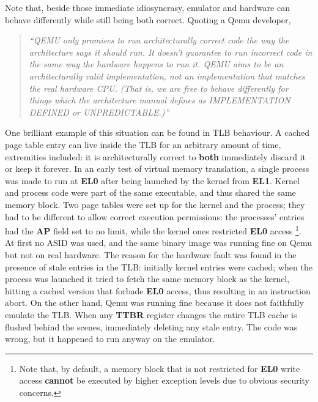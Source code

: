 \documentclass[12pt,a4paper,openright,twoside]{report}
\begin{document}
Note that, beside those immediate idiosyncrasy, emulator and hardware can behave
differently while still being both correct. Quoting a Qemu developer,

\begin{quote}
\textit{``QEMU only promises to run architecturally correct code the
way the architecture says it should run. It doesn't guarantee to
run incorrect code in the same way the hardware happens to run it.
QEMU aims to be an architecturally valid implementation, not
an implementation that matches the real hardware CPU. (That is, we are
free to behave differently for things which the architecture manual
defines as IMPLEMENTATION DEFINED or UNPREDICTABLE.)''}
\end{quote}

One brilliant example of this situation can be found in TLB behaviour. A cached
page table entry can live inside the TLB for an arbitrary amount of time, extremities
included: it is architecturally correct to \textbf{both} immediately discard it or 
keep it forever. 
In an early test of virtual memory translation, a single process was made to run
at \textbf{EL0} after being launched by the kernel from \textbf{EL1}. Kernel and
process code were part of the same executable, and thus shared the same memory block.
Two page tables were set up for the kernel and the process; they had to be different
to allow correct execution permissions: the processes' entries had the \textbf{AP}
field set to no limit, while the kernel ones restricted \textbf{EL0} access 
\footnote{Note that, by default, a memory block that is not restricted for 
\textbf{EL0} write access \textbf{cannot} be executed by higher exception levels
due to obvious security concerns.}.
At first no ASID was used, and the same binary image was running fine on Qemu 
but not on real hardware. The reason for the hardware fault was found in the presence
of stale entries in the TLB: initially kernel entries were cached; when the process
was launched it tried to fetch the same memory block as the kernel, hitting a
cached version that forbade \textbf{EL0} access, thus resulting in an instruction
abort.
On the other hand, Qemu was running fine because it does not faithfully emulate
the TLB. When any \textbf{TTBR} register changes the entire TLB cache is flushed
behind the scenes, immediately deleting any stale entry.
The code was wrong, but it happened to run anyway on the emulator.
\end{document}
